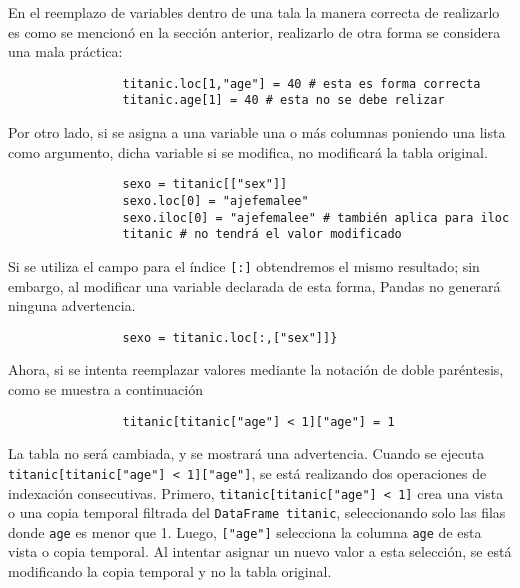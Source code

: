             \noindent En el reemplazo de variables dentro de una tala la manera correcta de realizarlo es como se mencionó en la sección anterior, realizarlo de otra forma se considera una mala práctica:

            \begin{verbatim}
                titanic.loc[1,"age"] = 40 # esta es forma correcta
                titanic.age[1] = 40 # esta no se debe relizar
            \end{verbatim}

            \noindent Por otro lado, si se asigna a una variable una o más columnas poniendo una lista como argumento, dicha variable si se modifica, no modificará la tabla original.

            \begin{verbatim}
                sexo = titanic[["sex"]]
                sexo.loc[0] = "ajefemalee"
                sexo.iloc[0] = "ajefemalee" # también aplica para iloc
                titanic # no tendrá el valor modificado
            \end{verbatim}
            
            \noindent Si se utiliza el campo para el índice \texttt{[:]} obtendremos el mismo resultado; sin embargo, al modificar una variable declarada de esta forma, Pandas no generará ninguna advertencia.
            
            \begin{verbatim}
                sexo = titanic.loc[:,["sex"]]}            
            \end{verbatim}
            
            Ahora, si se intenta reemplazar valores mediante la notación de doble paréntesis, como se muestra a continuación
            \begin{verbatim}
                titanic[titanic["age"] < 1]["age"] = 1
            \end{verbatim}
            
            \noindent La tabla no será cambiada, y se mostrará una advertencia. Cuando se ejecuta \texttt{titanic[titanic["age"] < 1]["age"]}, se está realizando dos operaciones de indexación consecutivas. Primero, \texttt{titanic[titanic["age"] < 1]} crea una vista o una copia temporal filtrada del \texttt{DataFrame titanic}, seleccionando solo las filas donde \texttt{age} es menor que 1. Luego, \texttt{["age"]} selecciona la columna \texttt{age} de esta vista o copia temporal. Al intentar asignar un nuevo valor a esta selección, se está modificando la copia temporal y no la tabla original.

